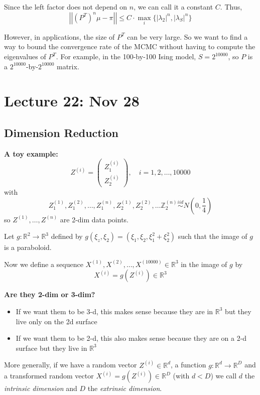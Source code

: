 \documentclass[12pt]{article}
\newcommand{\R}{\mathbb{R}}
\newcommand{\Z}{\mathbb{Z}}
\newcommand{\abs}[1]{\left\vert #1 \right\vert}
\newcommand{\iid}{\overset{iid}{\sim}}
\begin{document}
        Since the left factor does not depend on $n$, we can call it a constant $C$. Thus, 
        \[\abs{\abs{(P^T)^n \mu - \pi}}  \leq C \cdot \max_i \{\abs{\lambda_2}^n, \abs{\lambda_S}^n\}\]

        However, in applications, the size of $P^T$ can be very large. So we want to find a way to bound the convergence rate of the MCMC without having to compute the eigenvalues of $P^T$. For example, in the 100-by-100 Ising model, $S = 2^{10000}$, so $P$ is a $2^{10000}$-by-$2^{10000}$ matrix.

\section{Lecture 22: Nov 28}  
    \subsection{Dimension Reduction}
        \textbf{A toy example:} 
        \[Z^{(i)} = \begin{pmatrix}
            Z_1^{(i)}\\ 
            Z_2^{(i)}
        \end{pmatrix}, \quad i = 1, 2, \dots, 10000\] 
        with
        \[Z_1^{(1)}, Z_1^(2), \dots, Z_1^{(n)}, Z_2^{(1)}, Z_2^{(2)}, \dots \Z_2^{(n)} \iid N(0, \frac{1}{4})\]
        so $Z^{(1)}, \dots, Z^{(n)}$ are 2-dim data points. 

        Let $g: \R^2 \to \R^3$ defined by $g(\xi_z, \xi_2) = (\xi_1, \xi_2, \xi_1^2 + \xi_2^2)$ such that the image of $g$ is a paraboloid. 

        Now we define a sequence $X^{(1)}, X^{(2)}, \dots, X^{(10000)} \in \R^3$ in the image of $g$ by 
        \[X^{(i)} = g(Z^{(i)}) \in \R^3\]
        
        \textbf{Are they 2-dim or 3-dim?} 
        \begin{itemize}
            \item If we want them to be 3-d, this makes sense because they are in $\R^3$ but they live only on the 2d surface
            \item If we want them to be 2-d, this also makes sense because they are on a 2-d surface but they live in $\R^3$
        \end{itemize}

        More generally, if we have a random vector $Z^{(i)} \in \R^d$, a function $g: \R^d \to \R^D$ and a transformed random vector $X^{(i)} = g(Z^{(i)}) \in \R^D$ (with $d < D$) we call $d$ the \emph{intrinsic dimension} and $D$ the \emph{extrinsic dimension}. 
\end{document}

